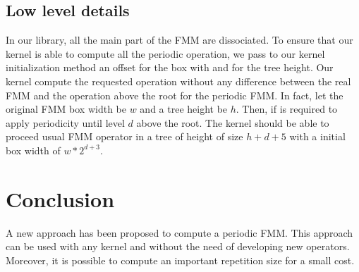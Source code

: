 \documentclass[12pt]{article} %
\begin{document}
\subsection{Low level details}

In our library, all the main part of the FMM are dissociated.
To ensure that our kernel is able to compute all the periodic operation, we pass to our kernel initialization method an offset for the box with and
for the tree height.
Our kernel compute the requested operation without any difference between the real FMM and the operation above the root for the periodic FMM.
In fact, let the original FMM box width be $w$ and a tree height be $h$.
Then, if is required to apply periodicity until level $d$ above the root.
The kernel should be able to proceed usual FMM operator in a tree of height of size $h+d+5$ with a initial box width of $w*2^{d+3}$.

\section{Conclusion}
A new approach has been proposed to compute a periodic FMM.
This approach can be used with any kernel and without the need of developing new operators.
Moreover, it is possible to compute an important repetition size for a small cost.
\end{document}
